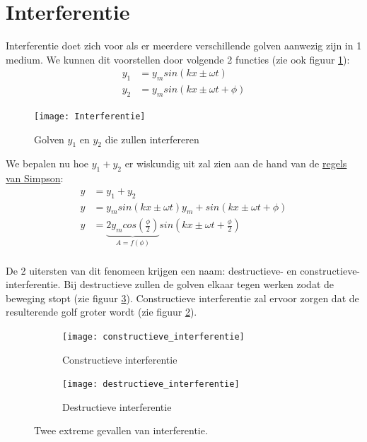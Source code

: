 \documentclass[a4paper,kul]{kulakarticle} %
\begin{document}
\section{Interferentie}
Interferentie doet zich voor als er meerdere verschillende golven aanwezig zijn in 1 medium. We kunnen dit voorstellen door volgende 2 functies (zie ook figuur \ref{fig:interferentie}):
\begin{align*}
	y_1 & = y_msin(kx\pm\omega t)\\
	y_2 & = y_msin(kx\pm\omega t +\phi)
\end{align*}
\begin{figure}[h]
	\centering
	\texttt{[image: Interferentie]}
	\caption[Interferentie]{Golven $y_1$ en $y_2$ die zullen interfereren}
	\label{fig:interferentie}
\end{figure}
We bepalen nu hoe $y_1+y_2$ er wiskundig uit zal zien aan de hand van de \href{https://nl.wikipedia.org/wiki/Lijst_van_goniometrische_gelijkheden#Som-naar-product-identiteiten_(regels_van_Simpson)}{regels van Simpson}:
\begin{align*}
	y & = y_1+y_2\\
	y & = y_msin(kx\pm\omega t) y_m+sin(kx\pm\omega t +\phi)\\
	y & = \underbrace{2y_mcos(\frac{\phi}{2})}_{A = f(\phi)}sin(kx\pm\omega t+\frac{\phi}{2})
\end{align*} \\
De 2 uitersten van dit fenomeen krijgen een naam: destructieve- en constructieve-interferentie. Bij destructieve zullen de golven elkaar tegen werken zodat de beweging stopt (zie figuur \ref{fig:destructief}). Constructieve interferentie zal ervoor zorgen dat de resulterende golf groter wordt (zie figuur \ref{fig:constructief}).
\begin{figure}[h]
	\centering
	\begin{subfigure}{.4\textwidth}
		\centering
		\texttt{[image: constructieve\_interferentie]}
		\caption{Constructieve interferentie}
		\label{fig:constructief}
	\end{subfigure}%
	\begin{subfigure}{.4\textwidth}
		\centering
		\texttt{[image: destructieve\_interferentie]}
		\caption{Destructieve interferentie}
		\label{fig:destructief}
	\end{subfigure}
	\caption{Twee extreme gevallen van interferentie.}
	\label{fig:omegaVZ}
\end{figure}
\newpage
\end{document}
